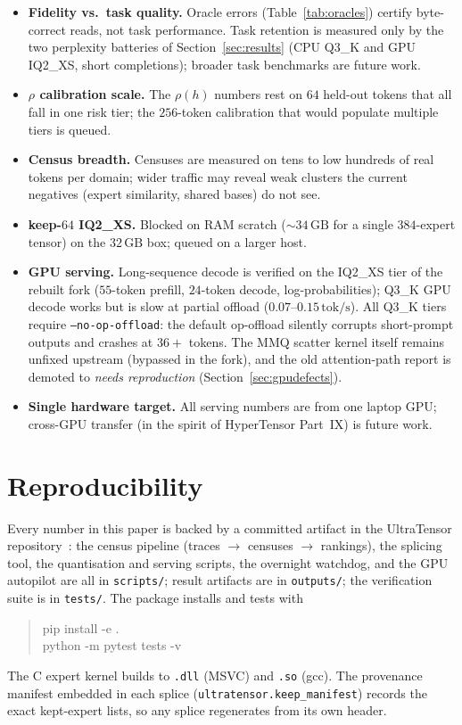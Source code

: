 \documentclass[11pt]{article}
\newcommand{\code}[1]{\texttt{#1}}
\newcommand{\gb}{\,\textrm{GB}}
\newcommand{\tps}{\,\textrm{tok/s}}
\begin{document}
\begin{itemize}[leftmargin=1.4em]
  \item \textbf{Fidelity vs.\ task quality.} Oracle errors (Table~\ref{tab:oracles})
    certify byte-correct reads, not task performance. Task retention is measured
    only by the two perplexity batteries of Section~\ref{sec:results} (CPU Q3\_K
    and GPU IQ2\_XS, short completions); broader task benchmarks are future work.
  \item \textbf{$\rho$ calibration scale.} The $\rho(h)$ numbers rest on $64$
    held-out tokens that all fall in one risk tier; the $256$-token calibration
    that would populate multiple tiers is queued.
  \item \textbf{Census breadth.} Censuses are measured on tens to low hundreds of
    real tokens per domain; wider traffic may reveal weak clusters the current
    negatives (expert similarity, shared bases) do not see.
  \item \textbf{keep-$64$ IQ2\_XS.} Blocked on RAM scratch (${\sim}34\gb{}$ for a
    single $384$-expert tensor) on the $32\gb{}$ box; queued on a larger host.
  \item \textbf{GPU serving.} Long-sequence decode is verified on the IQ2\_XS
    tier of the rebuilt fork ($55$-token prefill, $24$-token decode,
    log-probabilities); Q3\_K GPU decode works but is slow at partial offload
    ($0.07$--$0.15\tps$). All Q3\_K tiers require \code{--no-op-offload}: the
    default op-offload silently corrupts short-prompt outputs and crashes at
    $36{+}$ tokens. The MMQ scatter kernel itself remains unfixed upstream
    (bypassed in the fork), and the old attention-path report is demoted to
    \emph{needs reproduction} (Section~\ref{sec:gpudefects}).
  \item \textbf{Single hardware target.} All serving numbers are from one laptop
    GPU; cross-GPU transfer (in the spirit of HyperTensor Part~IX) is future work.
\end{itemize}

\section{Reproducibility}
\label{sec:repro}

Every number in this paper is backed by a committed artifact in the UltraTensor
repository~\cite{ultratensor}: the census pipeline (traces $\to$ censuses $\to$
rankings), the splicing tool, the quantisation and serving scripts, the overnight
watchdog, and the GPU autopilot are all in \code{scripts/}; result artifacts are
in \code{outputs/}; the verification suite is in \code{tests/}. The package
installs and tests with
\begin{quote}\ttfamily
pip install -e .\\
python -m pytest tests -v
\end{quote}
The C expert kernel builds to \code{.dll} (MSVC) and \code{.so} (gcc). The
provenance manifest embedded in each splice (\code{ultratensor.keep\_manifest})
records the exact kept-expert lists, so any splice regenerates from its own
header.
\end{document}
